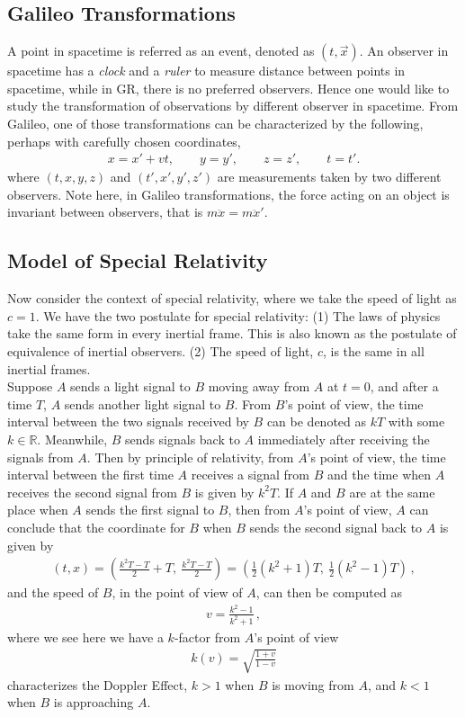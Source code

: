 \documentclass[11pt, onesided]{book}
\theoremstyle{break}
\theoremstyle{break}
\newcommand{\R}{\mathbb{R}}
\begin{document}
\subsection{Galileo Transformations}
A point in spacetime is referred as an event, denoted as $(t,\vec{x})$. An observer in spacetime has a \textit{clock} and a \textit{ruler} to measure distance between points in spacetime, while in GR, there is no preferred observers. Hence one would like to study the transformation of observations by different observer in spacetime. From Galileo, one of those transformations can be characterized by the following, perhaps with carefully chosen coordinates, 
\begin{align*}
 x = x' + vt,\qquad y=y', \qquad z = z',\qquad t=t'.
\end{align*}
where $(t,x,y,z)$ and $(t',x',y',z')$ are measurements taken by two different observers. Note here, in Galileo transformations, the force acting on an object is invariant between observers, that is $m\ddot{x} = m\ddot{x}'$. \\

\subsection{Model of Special Relativity}
Now consider the context of special relativity, where we take the speed of light as $c = 1$. We have the two postulate for special relativity: (1) The laws of physics take the same form in every inertial frame. This is also known as the postulate of equivalence of inertial observers. (2) The speed of light, $c$, is the same in all inertial frames.\\

Suppose $A$ sends a light signal to $B$ moving away from $A$ at $t=0$, and after a time $T$, $A$ sends another light signal to $B$. From $B$'s point of view, the time interval between the two signals received by $B$ can be denoted as $kT$ with some $k \in \R$. Meanwhile, $B$ sends signals back to $A$ immediately after receiving the signals from $A$. Then by principle of relativity, from $A$'s point of view, the time interval between the first time $A$ receives a signal from $B$ and the time when $A$ receives the second signal from $B$ is given by $k^2 T$. If $A$ and $B$ are at the same place when $A$ sends the first signal to $B$, then from $A$'s point of view, $A$ can conclude that the coordinate for $B$ when $B$ sends the second signal back to $A$ is given by
\begin{align*}
(t,x) = \left( \frac{k^2T - T}{2} + T, \ \frac{k^2 T-T}{2}\right) = \left( \frac{1}{2}(k^2+1) T, \ \frac{1}{2}(k^2 - 1) T\right)\,,
\end{align*}
and the speed of $B$, in the point of view of $A$, can then be computed as
\begin{align*}
v = \frac{k^2 - 1}{k^2 +1}\,,
\end{align*}
where we see here we have a $k$-factor from $A$'s point of view
\begin{align}
k(v) = \sqrt{\frac{1+v}{1-v}}
\end{align}
characterizes the Doppler Effect, $k>1$ when $B$ is moving from $A$, and $k<1$ when $B$ is approaching $A$. \\
\end{document}
